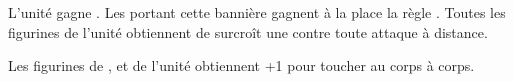 \endpricelist

\armymagicalbanners

\startpricelist

 L'unité gagne \bodyguard{\vampirelord{}, \vampirehero{}}. Les \vampireknights{} portant cette bannière gagnent à la place la règle \stubborn{}. Toutes les figurines de l'unité obtiennent de surcroît une  contre toute attaque à distance. 

 Les figurines de \barrowknights{}, \barrowguards{} et \barrowkings{} de l'unité obtiennent +1 pour toucher au corps à corps.

\endpricelist

\closearmymagicalitems








\quickrefsheettitle


\bigskip
\noindent\begin{center}\Large{\textbf{}}\end{center}
\medskip

\newcommand{\QRSinvoctable}[2]{%
\rowcolors{1}{white}{black!10}
\noindent\begin{tabular}{p{2.85cm}>{\centering\let\newline\\\arraybackslash\hspace{0pt}}p{1cm}@{}}%
\antiquefont\Large{\textbf{#1\spacebeforecolon{}:}}&\vspace*{-0.2cm}%
\DTLforeach*[#2]{profiles}{\rowname=name, \rowtrooptype=trooptype, \rowcategory=category, \rowinvocation=invocation}{%
\tabularnewline\rowname{} & \rowinvocation{}}%
\tabularnewline%
\end{tabular}
\medskip
}

